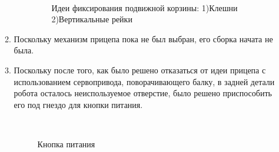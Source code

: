 \begin{enumerate}
\begin{enumerate}
\begin{enumerate}
			\begin{figure}[H]
				\begin{minipage}[h]{0.2\linewidth}
					\center  
				\end{minipage}
				\begin{minipage}[h]{0.6\linewidth}
					\caption{Идеи фиксирования подвижной корзины: 1)Клешни 2)Вертикальные рейки %
						}
				\end{minipage}
			\end{figure}
			
		\end{enumerate}
		
		\item Поскольку механизм прицепа пока не был выбран, его сборка начата не была.
		
		\item Поскольку после того, как было решено отказаться от идеи прицепа с использованием сервопривода, поворачивающего балку, в задней детали робота осталось неиспользуемое отверстие, было решено приспособить его под гнездо для кнопки питания.
		
		\begin{figure}[H]
			\begin{minipage}[h]{0.2\linewidth}
				\center  
			\end{minipage}
			\begin{minipage}[h]{0.6\linewidth}
				\caption{Кнопка питания}
			\end{minipage}
		\end{figure}
		

\end{enumerate}
\end{enumerate}
